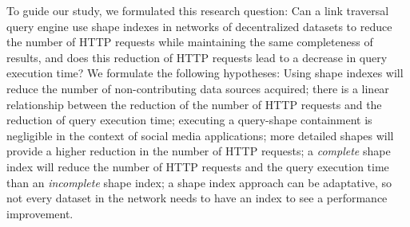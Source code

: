 To guide our study, we formulated this research question:
Can a link traversal query engine use shape indexes in networks of decentralized datasets to reduce the number of HTTP requests while maintaining the same completeness of results, and does this reduction of HTTP requests lead to a decrease in query execution time?
We formulate the following hypotheses:
Using shape indexes will reduce the number of non-contributing data sources acquired;
there is a linear relationship between the reduction of the number of HTTP requests and the reduction of query execution time;
executing a query-shape containment is negligible in the context of social media applications; 
more detailed shapes will provide a higher reduction in the number of HTTP requests;
a \emph{complete} shape index will reduce the number of HTTP requests and the query execution time than an \emph{incomplete} shape index;
a shape index approach can be adaptative, so not every dataset in the network needs to have an index to see a performance improvement.
\iffalse
Can our method reduce the ratio of non-contributing data source dereferenced?
How does the diminution of HTTP request affect the query execution time?
How does the level of detail of the shapes impact the performances?
What is the difference in performance between a \emph{complete} and an \emph{incomplete} shape index?
How does the ratio of subdomains containing an index influence global performances?
How does the fragmentation of the subdomain impact the performance?
How does the quantity of non-query contributing resources impact the performances?
What is the ideal query execution time if we only dereferenced contributing data sources?
\fi